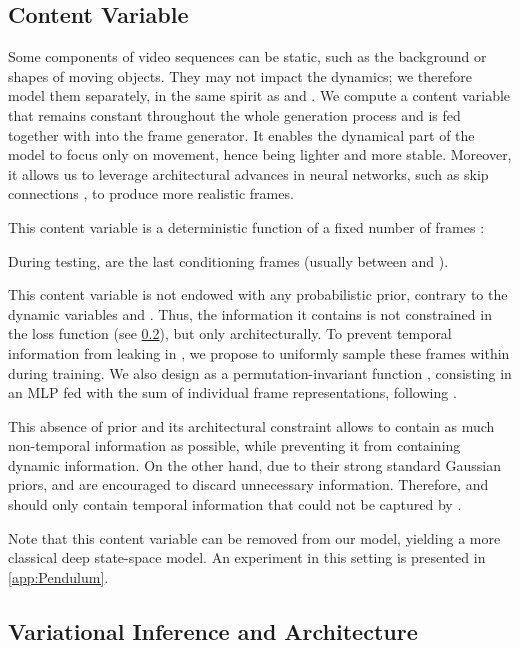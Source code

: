 \documentclass{article}
\begin{document}
\subsection{Content Variable}
\label{sec:ContentVariable}

Some components of video sequences can be static, such as the background or shapes of moving objects.
They may not impact the dynamics; we therefore model them separately, in the same spirit as \citet{Denton2017} and \citet{Yingzhen2018}. We compute a content variable  that remains constant throughout the whole generation process and is fed together with  into the frame generator.
It enables the dynamical part of the model to focus only on movement, hence being lighter and more stable.
Moreover, it allows us to leverage architectural advances in neural networks, such as skip connections \citep{Ronneberger2015}, to produce more realistic frames.

This content variable is a deterministic function  of a fixed number  of frames :

During testing,  are the last  conditioning frames (usually between  and ).

This content variable is not endowed with any probabilistic prior, contrary to the dynamic variables  and .
Thus, the information it contains is not constrained in the loss function (see \cref{sec:Inference}), but only architecturally.
To prevent temporal information from leaking in , we propose to uniformly sample these  frames within  during training.
We also design  as a permutation-invariant function \citep{Zaheer2017}, consisting in an MLP fed with the sum of individual frame representations, following \citet{Santoro2017}.

This absence of prior and its architectural constraint allows  to contain as much non-temporal information as possible, while preventing it from containing dynamic information.
On the other hand, due to their strong standard Gaussian priors,  and  are encouraged to discard unnecessary information.
Therefore,  and  should only contain temporal information that could not be captured by .

Note that this content variable can be removed from our model, yielding a more classical deep state-space model. An experiment in this setting is presented in \cref{app:Pendulum}.


\subsection{Variational Inference and Architecture}
\label{sec:Inference}
\end{document}
